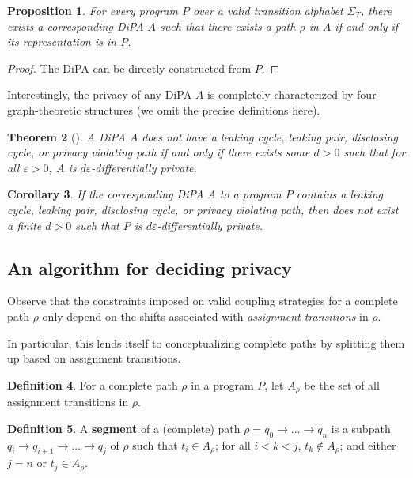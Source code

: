 \documentclass[12pt]{article}
\newtheorem{thm}{Theorem}[section]
\newtheorem{prop}[thm]{Proposition}
\newtheorem{cor}[thm]{Corollary}
\theoremstyle{definition}
\newtheorem{defn}[thm]{Definition}
\begin{document}
\begin{prop}
    For every program $P$ over a valid transition alphabet $\Sigma_T$, there exists a corresponding DiPA $A$ such that there exists a path $\rho$ in $A$ if and only if its representation is in $P$. 
\end{prop}
\begin{proof}
    The DiPA can be directly constructed from $P$.
\end{proof}

Interestingly, the privacy of any DiPA $A$ is completely characterized by four graph-theoretic structures (we omit the precise definitions here). 

\begin{thm}[\cite{chadhaLinearTimeDecidability2021}]\label{DiPACounterexamplesThm}
    A DiPA $A$ does not have a leaking cycle, leaking pair, disclosing cycle, or privacy violating path if and only if there exists some $d>0$ such that for all $\varepsilon>0$, $A$ is $d\varepsilon$-differentially private. 
\end{thm}

\begin{cor}
    If the corresponding DiPA $A$ to a program $P$ contains a leaking cycle, leaking pair, disclosing cycle, or privacy violating path, then does not exist a finite $d>0$ such that $P$ is $d\varepsilon$-differentially private. 
\end{cor}


\subsection{An algorithm for deciding privacy}

Observe that the constraints imposed on valid coupling strategies for a complete path $\rho$ only depend on the shifts associated with \textit{assignment transitions} in $\rho$. 

In particular, this lends itself to conceptualizing complete paths by splitting them up based on assignment transitions. 

\begin{defn}
    For a complete path $\rho$ in a program $P$, let $A_\rho$ be the set of all assignment transitions in $\rho$. 
\end{defn}

\begin{defn}
    A \textbf{segment} of a (complete) path $\rho = q_0\to\ldots\to q_n$ is a subpath $q_i \to q_{i+1}\to \ldots \to q_j$ of $\rho$ such that $t_i \in A_\rho$; for all $i<k<j$, $t_k \notin A_\rho$; and either $j=n$ or $t_j \in A_\rho$.
\end{defn}
\end{document}
